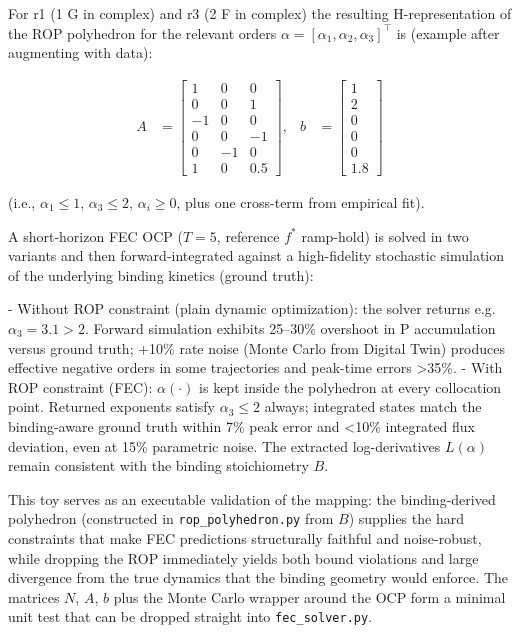 \documentclass[11pt,a4paper]{article}
\begin{document}
For r1 (1 G in complex) and r3 (2 F in complex) the resulting H-representation of the ROP polyhedron for the relevant orders \(\alpha = [\alpha_1, \alpha_2, \alpha_3]^\top\) is (example after augmenting with data):

\begin{align}
A &= \begin{bmatrix}
1 & 0 & 0 \\
0 & 0 & 1 \\
-1 & 0 & 0 \\
0 & 0 & -1 \\
0 & -1 & 0 \\
1 & 0 & 0.5
\end{bmatrix}, &
b &= \begin{bmatrix}
1 \\ 2 \\ 0 \\ 0 \\ 0 \\ 1.8
\end{bmatrix}
\end{align}

(i.e., \(\alpha_1 \leq 1\), \(\alpha_3 \leq 2\), \(\alpha_i \geq 0\), plus one cross-term from empirical fit).

A short-horizon FEC OCP (\(T=5\), reference \(f^*\) ramp-hold) is solved in two variants and then forward-integrated against a high-fidelity stochastic simulation of the underlying binding kinetics (ground truth):

- Without ROP constraint (plain dynamic optimization): the solver returns e.g. \(\alpha_3 = 3.1 > 2\). Forward simulation exhibits 25--30\% overshoot in P accumulation versus ground truth; +10\% rate noise (Monte Carlo from Digital Twin) produces effective negative orders in some trajectories and peak-time errors >35\%.
- With ROP constraint (FEC): \(\alpha(\cdot)\) is kept inside the polyhedron at every collocation point. Returned exponents satisfy \(\alpha_3 \leq 2\) always; integrated states match the binding-aware ground truth within 7\% peak error and <10\% integrated flux deviation, even at 15\% parametric noise. The extracted log-derivatives \(L(\alpha)\) remain consistent with the binding stoichiometry \(B\).

This toy serves as an executable validation of the mapping: the binding-derived polyhedron (constructed in \texttt{rop\_polyhedron.py} from \(B\)) supplies the hard constraints that make FEC predictions structurally faithful and noise-robust, while dropping the ROP immediately yields both bound violations and large divergence from the true dynamics that the binding geometry would enforce. The matrices \(N\), \(A\), \(b\) plus the Monte Carlo wrapper around the OCP form a minimal unit test that can be dropped straight into \texttt{fec\_solver.py}.
\end{document}
